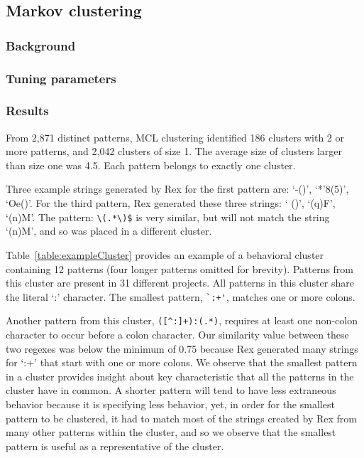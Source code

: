 \subsection{Markov clustering}
\subsubsection{Background}
\subsubsection{Tuning parameters}
\subsubsection{Results}

From 2,871 distinct patterns, MCL clustering identified 186 clusters with 2 or more patterns, and 2,042 clusters of size 1.
 The average size of clusters larger than size one was 4.5.  Each pattern belongs to exactly one cluster.

Three example strings generated by Rex for the first pattern are: `-()', `*'8(5)', `Oe()'.  For the third pattern, Rex generated these three strings: ` ()', `(q)F', `(n)M'.  The pattern: \verb!\(.*\)$! is very similar, but will not match the string `(n)M', and so was placed in a different cluster.


Table~\ref{table:exampleCluster} provides an example of a behavioral cluster containing 12 patterns (four longer patterns omitted for brevity). Patterns from this cluster are present in 31 different projects.  All patterns in this cluster share the literal `:' character. The smallest pattern, \verb!`:+'!,  matches one or more colons.


Another pattern from this cluster, \verb!([^:]+):(.*)!, requires at least one non-colon character to occur before a colon character.  Our similarity value between these two regexes was below the minimum of 0.75 because Rex generated many strings for `:+' that start with one or more colons.
We observe that the smallest pattern in a cluster provides insight about key characteristic that all the patterns in the cluster have in common.  A shorter pattern will tend to have less extraneous behavior because it is specifying less behavior,
yet, in order for the smallest pattern to be clustered, it had to match most of the strings created by Rex from many other patterns within the cluster, and so we observe that {the smallest pattern is useful as a representative of the cluster}.

